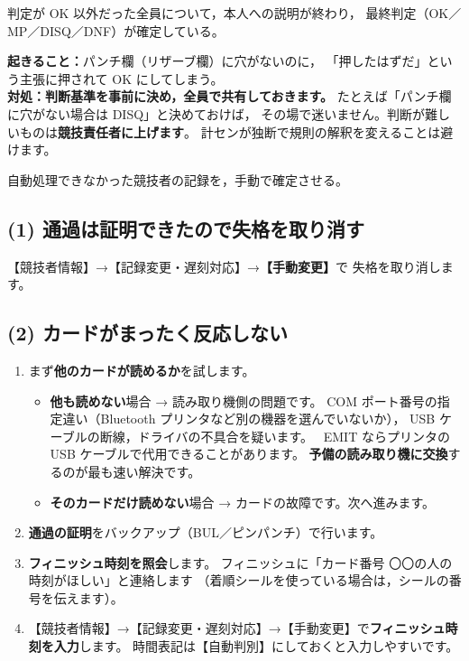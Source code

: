 \begin{Done}
判定が OK 以外だった全員について，本人への説明が終わり，
最終判定（OK／MP／DISQ／DNF）が確定している。
\end{Done}

\begin{Fail}
\textbf{起きること：}パンチ欄（リザーブ欄）に穴がないのに，
「押したはずだ」という主張に押されて OK にしてしまう。\\
\textbf{対処：}\textbf{判断基準を事前に決め，全員で共有しておきます。}
たとえば「パンチ欄に穴がない場合は DISQ」と決めておけば，
その場で迷いません。判断が難しいものは\textbf{競技責任者に上げます}。
計センが独断で規則の解釈を変えることは避けます。
\end{Fail}


\begin{Goal}
自動処理できなかった競技者の記録を，手動で確定させる。
\end{Goal}

\subsection*{(1) 通過は証明できたので失格を取り消す}

【競技者情報】→【記録変更・遅刻対応】→\textbf{【手動変更】}で
失格を取り消します。\ver

\subsection*{(2) カードがまったく反応しない}

\begin{enumerate}
\item まず\textbf{他のカードが読めるか}を試します。
      \begin{itemize}
      \item \textbf{他も読めない}場合 → 読み取り機側の問題です。
            COM ポート番号の指定違い（Bluetooth プリンタなど別の機器を選んでいないか），
            USB ケーブルの断線，ドライバの不具合を疑います。
            \tEMIT\ EMIT ならプリンタの USB ケーブルで代用できることがあります。
            \textbf{予備の読み取り機に交換}するのが最も速い解決です。
      \item \textbf{そのカードだけ読めない}場合 → カードの故障です。次へ進みます。
      \end{itemize}
\item \textbf{通過の証明}をバックアップ（BUL／ピンパンチ）で行います。
\item \textbf{フィニッシュ時刻を照会}します。
      フィニッシュに「カード番号 〇〇の人の時刻がほしい」と連絡します
      （着順シールを使っている場合は，シールの番号を伝えます）。
\item 【競技者情報】→【記録変更・遅刻対応】→【手動変更】で\textbf{フィニッシュ時刻を入力}します。
      時間表記は【自動判別】にしておくと入力しやすいです。
\end{enumerate}

